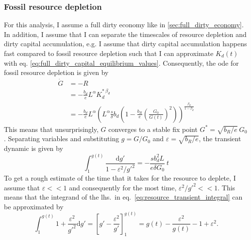 \subsubsection{Fossil resource depletion}
\label{sec:resource_depletion}


For this analysis, I assume a full dirty economy like in \ref{sec:full_dirty_economy}. In addition, I assume that I can separate the timescales of resource depletion and dirty capital accumulation, e.g. I assume that dirty capital accumulation happens fast compared to fossil resource depletion such that I can approximate $K_d(t)$ with eq. \ref{eq:full_dirty_capital_equilibrium_values}. Consequently, the ode for fossil resource depletion is given by
\begin{align}
	\dot{G} &= -R \nonumber \\
        &= -\frac{b_d}{e}L^{\alpha}K_d^{*\ \beta_d} \nonumber \\
	&= - \frac{b_d}{e}L^{\alpha}\left(L^{\alpha} \frac{s}{\delta}b_d\left( 1-\frac{b_R}{e}\left( \frac{G_0}{G(t)} \right)^2 \right) \right)^{\frac{\beta_d}{1-\beta_d}}
	\label{eq:resource_deprec_approx}
\end{align}
This means that unsurprisingly, $G$ converges to a stable fix point $G^* = \sqrt{b_R/e}\ G_0$. Separating variables and substituting $g = G/G_0$ and $\varepsilon = \sqrt{b_R/e}$, the transient dynamic is given by
\begin{equation}
	\int_1^{g(t)} \frac{{\mathrm d} g'}{1 - \varepsilon^2/g'^2} = - \frac{s b_d^2 L}{e \delta G_0} \ t
	\label{eq:resource_transient_integral}
\end{equation}
To get a rough estimate of the time that it takes for the resource to deplete, I assume that $\varepsilon << 1$ and consequently for the most time, $\varepsilon^2/g'^2 << 1$.
This means that the integrand of the lhs.\ in eq.~\eqref{eq:resource_transient_integral} can be approximated by
\begin{equation}
	\int_1^{g(t)}1+\frac{\varepsilon^2}{g'^2} {\mathrm d}g' = \left[ g' - \frac{\varepsilon^2}{g'} \right]_1^{g(t)} = g(t) - \frac{\varepsilon^2}{g(t)} -1+\varepsilon^2.
	\label{eq:resource_transient_solution}
\end{equation}

